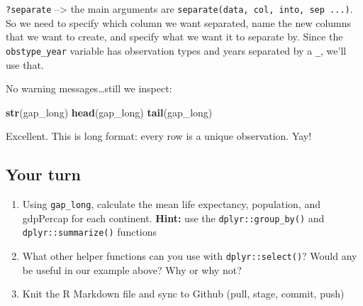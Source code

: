 \documentclass[]{book}
\newenvironment{Shaded}{\begin{snugshade}}{\end{snugshade}}
\newcommand{\KeywordTok}[1]{\textcolor[rgb]{0.13,0.29,0.53}{\textbf{{#1}}}}
\newcommand{\DataTypeTok}[1]{\textcolor[rgb]{0.13,0.29,0.53}{{#1}}}
\newcommand{\StringTok}[1]{\textcolor[rgb]{0.31,0.60,0.02}{{#1}}}
\newcommand{\NormalTok}[1]{{#1}}
\theoremstyle{definition}
\theoremstyle{definition}
\theoremstyle{definition}
\theoremstyle{remark}
\begin{document}
\texttt{?separate} --\textgreater{} the main arguments are
\texttt{separate(data,\ col,\ into,\ sep\ ...)}. So we need to specify
which column we want separated, name the new columns that we want to
create, and specify what we want it to separate by. Since the
\texttt{obstype\_year} variable has observation types and years
separated by a \texttt{\_}, we'll use that.

\begin{Shaded}
\end{Shaded}

No warning messages\ldots{}still we inspect:

\begin{Shaded}
\begin{Highlighting}[]
\KeywordTok{str}\NormalTok{(gap_long)}
\KeywordTok{head}\NormalTok{(gap_long)}
\KeywordTok{tail}\NormalTok{(gap_long)}
\end{Highlighting}
\end{Shaded}

Excellent. This is long format: every row is a unique observation. Yay!

\subsection{Your turn}\label{your-turn-9}

\begin{enumerate}
\def\labelenumi{\arabic{enumi}.}
\item
  Using \texttt{gap\_long}, calculate the mean life expectancy,
  population, and gdpPercap for each continent. \textbf{Hint:} use the
  \texttt{dplyr::group\_by()} and \texttt{dplyr::summarize()} functions
\item
  What other helper functions can you use with \texttt{dplyr::select()}?
  Would any be useful in our example above? Why or why not?
\item
  Knit the R Markdown file and sync to Github (pull, stage, commit,
  push)
\end{enumerate}
\end{document}
